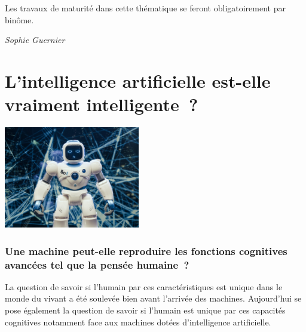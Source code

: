 \documentclass[
  10pt,
  french,
  a5paper,
  openany]{book}
\newenvironment{signature}{\begin{flushright}}{\end{flushright}}
\begin{document}
Les travaux de maturité dans cette thématique se feront obligatoirement par binôme.

\begin{signature}
\emph{Sophie Guernier}

\end{signature}

\hypertarget{lintelligence-artificielle-est-elle-vraiment-intelligente}{%
\chapter{\texorpdfstring{L'intelligence artificielle \linebreak est-elle vraiment intelligente~?}{L'intelligence artificielle est-elle vraiment intelligente~?}}\label{lintelligence-artificielle-est-elle-vraiment-intelligente}}

\begin{center}
\includegraphics[width=\textwidth,height=12em]{images/intelligence-artificelle.jpeg}

\end{center}

\hypertarget{une-machine-peut-elle-reproduire-les-fonctions-cognitives-avancuxe9es-tel-que-la-pensuxe9e-humaine}{%
\subsection*{Une machine peut-elle reproduire les fonctions cognitives avancées tel que la pensée humaine~?}\label{une-machine-peut-elle-reproduire-les-fonctions-cognitives-avancuxe9es-tel-que-la-pensuxe9e-humaine}}

La question de savoir si l'humain par ces caractéristiques est unique dans le monde du vivant a été soulevée bien avant l'arrivée des machines. Aujourd'hui se pose également la question de savoir si l'humain est unique par ces capacités cognitives notamment face aux machines dotées d'intelligence artificielle.
\end{document}
